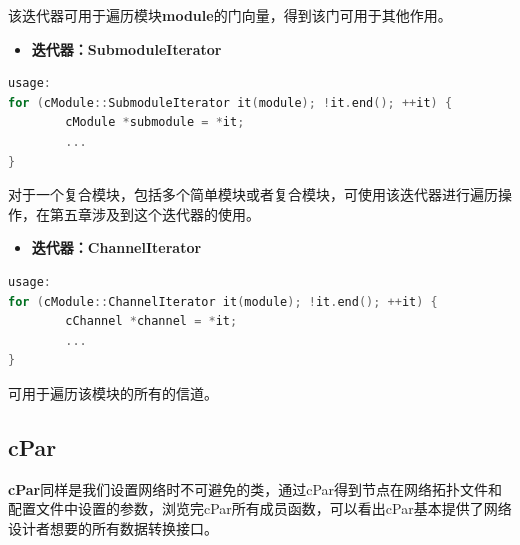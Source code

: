 该迭代器可用于遍历模块\textbf{module}的门向量，得到该门可用于其他作用。

\begin{itemize}
\item \textbf{迭代器：SubmoduleIterator}

\end{itemize}

\begin{lstlisting}[language=c]
usage:
for (cModule::SubmoduleIterator it(module); !it.end(); ++it) {
        cModule *submodule = *it;
        ...
}
\end{lstlisting}

对于一个复合模块，包括多个简单模块或者复合模块，可使用该迭代器进行遍历操作，在第五章涉及到这个迭代器的使用。

\begin{itemize}
\item \textbf{迭代器：ChannelIterator}

\end{itemize}

\begin{lstlisting}[language=c]
usage:
for (cModule::ChannelIterator it(module); !it.end(); ++it) {
        cChannel *channel = *it;
        ...
}
\end{lstlisting}

可用于遍历该模块的所有的信道。

\subsection{cPar}
\label{cpar}

\textbf{cPar}同样是我们设置网络时不可避免的类，通过cPar得到节点在网络拓扑文件和配置文件中设置的参数，浏览完cPar所有成员函数，可以看出cPar基本提供了网络设计者想要的所有数据转换接口。

